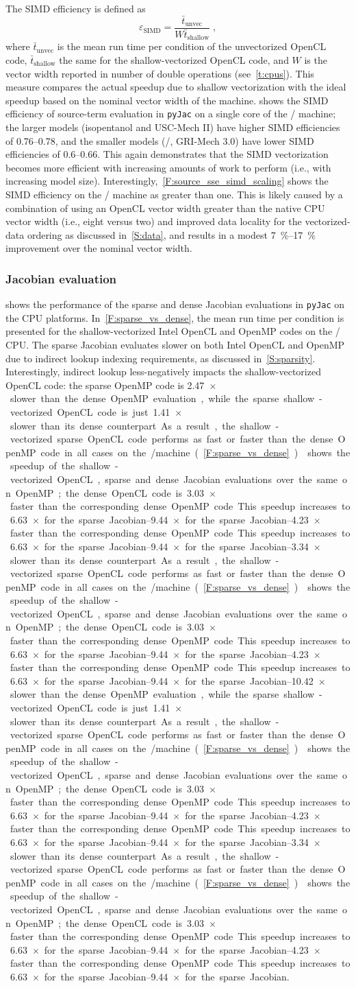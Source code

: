 \documentclass[12pt,number,sort&compress,preprint]{elsarticle}
\begin{document}
The SIMD efficiency is defined as
\begin{equation}
 \label{e:simd_efficiency}
 \varepsilon_{\text{SIMD}} = \frac{\bar{t}_{\text{unvec}}}{W \bar{t}_{\text{shallow}}} \;,
\end{equation}
where $\bar{t}_{\text{unvec}}$ is the mean run time per condition of the unvectorized OpenCL code, $\bar{t}_{\text{shallow}}$ the same for the shallow-vectorized OpenCL code, and $W$ is the vector width reported in number of double operations (see~\cref{t:cpus}).
This measure compares the actual speedup due to shallow vectorization with the ideal speedup based on the nominal vector width of the machine.
 shows the SIMD efficiency of source-term evaluation in \texttt{pyJac} on a single core of the \avx/ machine; the larger models (isopentanol and USC-Mech II) have higher SIMD efficiencies of \numrange{0.76}{0.78}, and the smaller models (\slash{}, GRI-Mech \num{3.0}) have lower SIMD efficiencies of \numrange{0.6}{0.66}.
This again demonstrates that the SIMD vectorization becomes more efficient with increasing amounts of work to perform (i.e., with increasing model size).
Interestingly,~\cref{F:source_sse_simd_scaling} shows the SIMD efficiency on the \sse/ machine as greater than one.
This is likely caused by a combination of using an OpenCL vector width greater than the native CPU vector width (i.e., eight versus two) and improved data locality for the vectorized-data ordering as discussed in~\cref{S:data}, and results in a modest \SIrange{7}{17}{\percent} improvement over the nominal vector width.


\subsubsection{Jacobian evaluation}
\label{S:jacobian_results}

 shows the performance of the sparse and dense Jacobian evaluations in \texttt{pyJac} on the CPU platforms.
In~\cref{F:sparse_vs_dense}, the mean run time per condition is presented for the shallow-vectorized Intel OpenCL and OpenMP codes on the \avx/ CPU.
The sparse Jacobian evaluates slower on both Intel OpenCL and OpenMP due to indirect lookup indexing requirements, as discussed in~\cref{S:sparsity}.
Interestingly, indirect lookup less-negatively impacts the shallow-vectorized OpenCL code: the sparse OpenMP code is \SIrange{2.47}{10.42}{$\times$} slower than the dense OpenMP evaluation, while the sparse shallow-vectorized OpenCL code is just \SIrange{1.41}{3.34}{$\times$} slower than its dense counterpart.
As a result, the shallow-vectorized sparse OpenCL code performs as fast or faster than the dense OpenMP code in all cases on the \avx/ machine (\cref{F:sparse_vs_dense}).
 shows the speedup of the shallow-vectorized OpenCL, sparse and dense Jacobian evaluations over the same on OpenMP; the dense OpenCL code is \SIrange{3.03}{4.23}{$\times$} faster than the corresponding dense OpenMP code.
This speedup increases to \SIrange{6.63}{9.44}{$\times$} for the sparse Jacobian.
\end{document}
